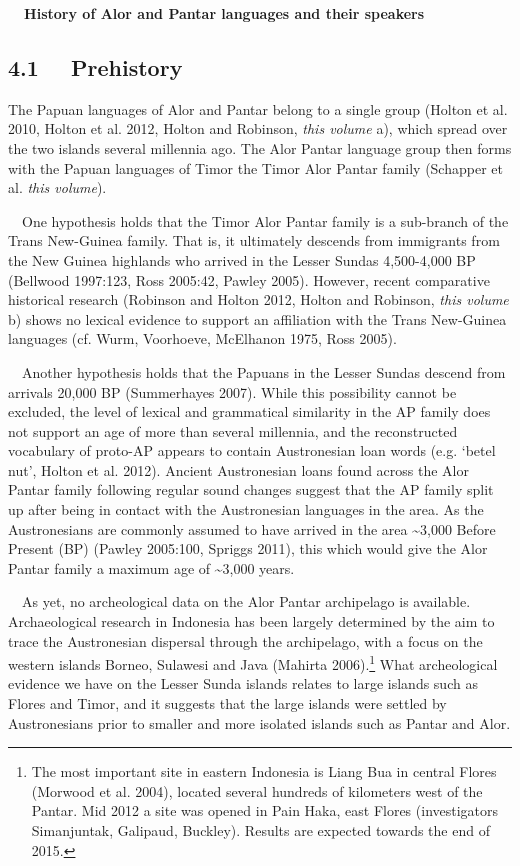 {\bfseries
\ \ History of Alor and Pantar languages and their speakers}

\subsection[4.1 \ \ Prehistory]{4.1 \ \ Prehistory}
The Papuan languages of Alor and Pantar belong to a single group (Holton et al. 2010, Holton et al. 2012, Holton and Robinson, \textit{this volume} a), which spread over the two islands several millennia ago. The Alor Pantar language group then forms with the Papuan languages of Timor the Timor Alor Pantar family (Schapper et al. \textit{this volume}).

\ \ One hypothesis holds that the Timor Alor Pantar family is a sub-branch of the Trans New-Guinea family. That is, it ultimately descends from immigrants from the New Guinea highlands who arrived in the Lesser Sundas 4,500-4,000 BP (Bellwood 1997:123, Ross 2005:42, Pawley 2005). However, recent comparative historical research (Robinson and Holton 2012, Holton and Robinson, \textit{this volume} b) shows no lexical evidence to support an affiliation with the Trans New-Guinea languages (cf. Wurm, Voorhoeve, McElhanon 1975, Ross 2005).

\ \ Another hypothesis holds that the Papuans in the Lesser Sundas descend from arrivals 20,000 BP (Summerhayes 2007). While this possibility cannot be excluded, the level of lexical and grammatical similarity in the AP family does not support an age of more than several millennia, and the reconstructed vocabulary of proto-AP appears to contain Austronesian loan words (e.g. {\textquoteleft}betel nut{\textquoteright}, Holton et al. 2012). Ancient Austronesian loans found across the Alor Pantar family following regular sound changes suggest that the AP family split up after being in contact with the Austronesian languages in the area. As the Austronesians are commonly assumed to have arrived in the area \~{}3,000 Before Present (BP) (Pawley 2005:100, Spriggs 2011), this which would give the Alor Pantar family a maximum age of \~{}3,000 years.

\ \ As yet, no archeological data on the Alor Pantar archipelago is available. Archaeological research in Indonesia has been largely determined by the aim to trace the Austronesian dispersal through the archipelago, with a focus on the western islands Borneo, Sulawesi and Java (Mahirta 2006).\footnote{The most important site in eastern Indonesia is Liang Bua in central Flores (Morwood et al. 2004), located several hundreds of kilometers west of the Pantar.  Mid 2012 a site was opened in Pain Haka, east Flores (investigators Simanjuntak, Galipaud, Buckley). Results are expected towards the end of 2015.} What archeological evidence we have on the Lesser Sunda islands relates to large islands such as Flores and Timor, and it suggests that the large islands were settled by Austronesians prior to smaller and more isolated islands such as Pantar and Alor. 

